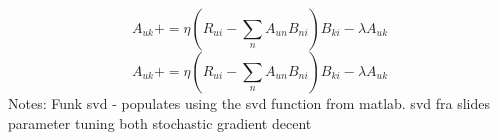 \begin{equation}\label{funk}
A_{uk} += \eta (R_{ui} - \sum_n A_{un}B_{ni})B_{ki} - \lambda A_{uk}
\end{equation}
\begin{equation}\label{slide}
A_{uk} += \eta (R_{ui} - \sum_n A_{un}B_{ni})B_{ki} - \lambda A_{uk}
\end{equation}
Notes: 
Funk svd - populates using the svd function from matlab.
svd fra slides
parameter tuning
both stochastic gradient decent



